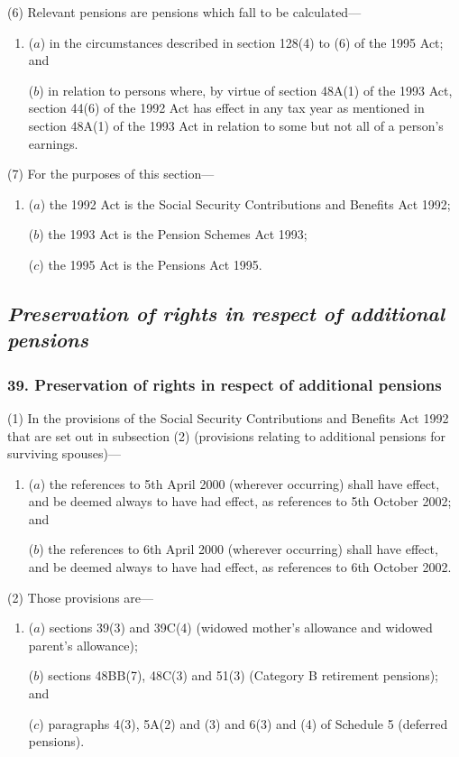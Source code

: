 \documentclass[12pt,a4paper]{article}
\begin{document}
(6) Relevant pensions are pensions which fall to be calculated—
\begin{enumerate}\item[]
($a$) in the circumstances described in section 128(4)  to (6)  of the 1995 Act; and

($b$) in relation to persons where, by virtue of section 48A(1)  of the 1993 Act, section 44(6)  of the 1992 Act has effect in any tax year as mentioned in section 48A(1)  of the 1993 Act in relation to some but not all of a person’s earnings.
\end{enumerate}

(7) For the purposes of this section—
\begin{enumerate}\item[]
($a$) the 1992 Act is the Social Security Contributions and Benefits Act 1992;

($b$) the 1993 Act is the Pension Schemes Act 1993;

($c$) the 1995 Act is the Pensions Act 1995. 
\end{enumerate}

\subsection{\itshape Preservation of rights in respect of additional pensions}

\subsubsection{39. Preservation of rights in respect of additional pensions}

(1) In the provisions of the Social Security Contributions and Benefits Act 1992 that are set out in subsection (2)  (provisions relating to additional pensions for surviving spouses)—
\begin{enumerate}\item[]
($a$) the references to 5th April 2000 (wherever occurring) shall have effect, and be deemed always to have had effect, as references to 5th October 2002; and

($b$) the references to 6th April 2000 (wherever occurring) shall have effect, and be deemed always to have had effect, as references to 6th October 2002. 
\end{enumerate}

(2) Those provisions are—
\begin{enumerate}\item[]
($a$) sections 39(3)  and 39C(4)  (widowed mother’s allowance and widowed parent’s allowance);

($b$) sections 48BB(7), 48C(3)  and 51(3)  (Category B retirement pensions); and

($c$) paragraphs 4(3), 5A(2)  and (3)  and 6(3)  and (4)  of Schedule 5 (deferred pensions).
\end{enumerate}
\end{document}
